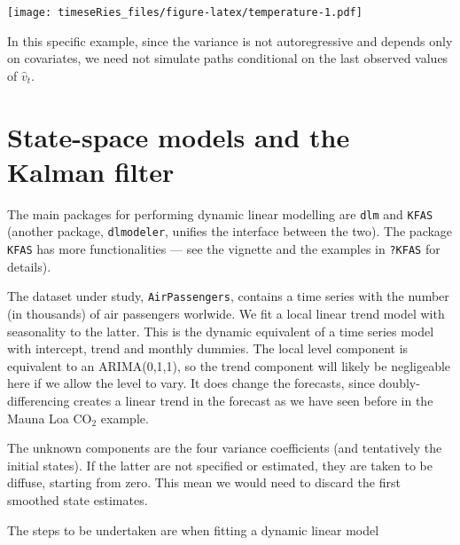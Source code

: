 \documentclass[]{book}
\begin{document}
\texttt{[image: timeseRies\_files/figure-latex/temperature-1.pdf]}

In this specific example, since the variance is not autoregressive and
depends only on covariates, we need not simulate paths conditional on
the last observed values of \(\widehat{v}_t\).

\hypertarget{state-space-models-and-the-kalman-filter}{%
\section{State-space models and the Kalman
filter}\label{state-space-models-and-the-kalman-filter}}

The main packages for performing dynamic linear modelling are
\texttt{dlm} and \texttt{KFAS} (another package, \texttt{dlmodeler},
unifies the interface between the two). The package \texttt{KFAS} has
more functionalities --- see the vignette and the examples in
\texttt{?KFAS} for details).

The dataset under study, \texttt{AirPassengers}, contains a time series
with the number (in thousands) of air passengers worlwide. We fit a
local linear trend model with seasonality to the latter. This is the
dynamic equivalent of a time series model with intercept, trend and
monthly dummies. The local level component is equivalent to an
ARIMA(0,1,1), so the trend component will likely be negligeable here if
we allow the level to vary. It does change the forecasts, since
doubly-differencing creates a linear trend in the forecast as we have
seen before in the Mauna Loa CO\(_2\) example.

The unknown components are the four variance coefficients (and
tentatively the initial states). If the latter are not specified or
estimated, they are taken to be diffuse, starting from zero. This mean
we would need to discard the first smoothed state estimates.

The steps to be undertaken are when fitting a dynamic linear model
\end{document}
